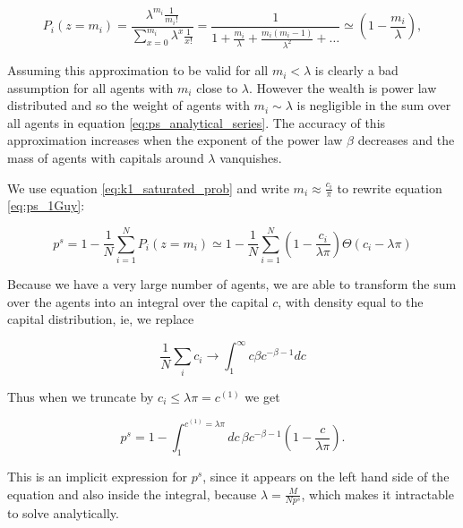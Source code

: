 \begin{equation}
\label{eq:ps_analytical_series}
P_i(z=m_i) = \frac{\lambda^{m_i} \frac{1}{m_i!}}{\sum_{x=0}^{m_i} \lambda^x \frac{1}{x!}} = \frac{1}{1 + \frac{m_i}{\lambda} + \frac{m_i (m_i -1)}{\lambda^2} + \ldots} \simeq  \left( 1 - \frac{m_i}{\lambda} \right),
\end{equation}

Assuming this approximation to be valid for all $m_i < \lambda$ is clearly a bad assumption for all agents with $m_i$ close to $\lambda$. However the wealth is power law distributed and so the weight of agents with $m_i \sim \lambda$ is negligible in the sum over all agents in equation \eqref{eq:ps_analytical_series}. The accuracy of this approximation increases when the exponent of the power law $\beta$ decreases and the mass of agents with capitals around $\lambda$ vanquishes. 

We use equation \eqref{eq:k1_saturated_prob} and write $m_i \approx \frac{c_i}{\pi}$ to rewrite equation \eqref{eq:ps_1Guy}:

\begin{equation}
\label{eq:ps_first_approx}
p^s = 1 - \frac{1}{N} \sum_{i=1}^{N} P_i(z = m_i) \simeq 1 - \frac{1}{N} \sum_{i=1}^N \left(1 - \frac{c_i}{\lambda \pi}\right) \Theta\left(c_i - \lambda \pi \right)
\end{equation}

Because we have a very large number of agents, we are able to transform the sum over the agents into an integral over the capital $c$, with density equal to the capital distribution, ie, we replace

\begin{equation}
\frac{1}{N} \sum_i c_i \to \int_1^\infty c \beta c^{-\beta - 1} dc
\end{equation}

Thus when we truncate by $c_i \leq \lambda \pi = c^{(1)}$ we get

\begin{equation}
\label{eq:app_ps_analytic1}
p^s = 1 - \int_1^{c^{(1)} = \lambda \pi} dc\, \beta c^{-\beta - 1} \left( 1 - \frac{c}{\lambda \pi} \right).
\end{equation}

This is an implicit expression for $p^s$, since it appears on the left hand side of the equation and also inside the integral, because $\lambda = \frac{M}{N p^s}$, which makes it intractable to solve analytically. 

